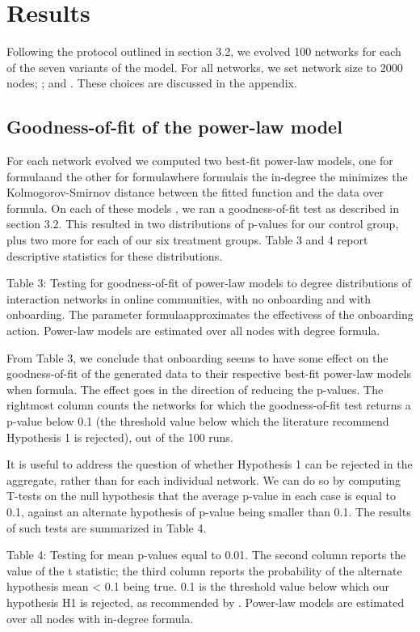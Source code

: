
\section{Results}
Following the protocol outlined in section 3.2, we evolved 100 networks for each of the seven variants of the model. For all networks, we set network size to 2000 nodes; ; and . These choices are discussed in the appendix.

\subsection{Goodness-of-fit of the power-law model}

For each network evolved we computed two best-fit power-law models, one for formulaand the other for formulawhere formulais the in-degree the minimizes the Kolmogorov-Smirnov distance between the fitted function and the data over formula. On each of these models , we ran a goodness-of-fit test as described in section 3.2. This resulted in two distributions of p-values for our control group, plus two more for each of our six treatment groups. Table 3 and 4 report descriptive statistics for these distributions.

Table 3: Testing for goodness-of-fit of power-law models to degree distributions of interaction networks in online communities, with no onboarding and with onboarding. The parameter formulaapproximates the effectivess of the onboarding action. Power-law models are estimated over all nodes with degree formula.

From Table 3, we conclude that onboarding seems to have some effect on the goodness-of-fit of the generated data to their respective best-fit power-law models when formula. The effect goes in the direction of reducing the p-values. The rightmost column counts the networks for which the goodness-of-fit test returns a p-value below 0.1 (the threshold value below which the literature recommend Hypothesis 1 is rejected), out of the 100 runs. 

It is useful to address the question of whether Hypothesis 1 can be rejected in the aggregate, rather than for each individual network. We can do so by computing T-tests on the null hypothesis that the average p-value in each case is equal to 0.1, against an alternate hypothesis of p-value being smaller than 0.1. The results of such tests are summarized in Table 4.

Table 4: Testing for mean p-values equal to 0.01. The second column reports the value of the t statistic; the third column reports the probability of the alternate hypothesis mean < 0.1 being true. 0.1 is the threshold value below which our hypothesis H1 is rejected, as recommended by \cite{clauset2009power}. Power-law models are estimated over all nodes with in-degree formula.

